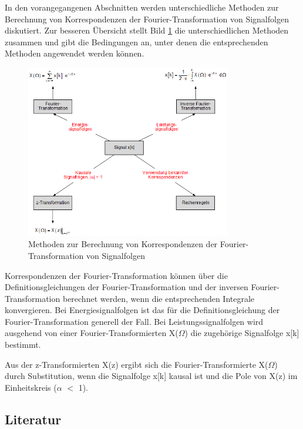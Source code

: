 \noindent In den vorangegangenen Abschnitten werden unterschiedliche Methoden zur Berechnung von Korrespondenzen der Fourier-Transformation von Signalfolgen diskutiert. Zur besseren \"{U}bersicht stellt Bild \ref{fig:MethodenFourierTransformation} die unterschiedlichen Methoden zusammen und gibt die Bedingungen an, unter denen die entsprechenden Methoden angewendet werden k\"{o}nnen.

\begin{figure}[H]
  \centerline{\includegraphics[width=0.8\textwidth]{Kapitel7/Bilder/image21.png}}
  \caption{Methoden zur Berechnung von Korrespondenzen der Fourier-Transformation von Signalfolgen}
  \label{fig:MethodenFourierTransformation}
\end{figure}

\noindent Korrespondenzen der Fourier-Transformation k\"{o}nnen \"{u}ber die Definitionsgleichungen der Fourier-Transformation und der inversen Fourier-Transformation berechnet werden, wenn die entsprechenden Integrale konvergieren. Bei Energiesignalfolgen ist das f\"{u}r die Definitionsgleichung der Fourier-Transformation generell der Fall. Bei Leistungssignalfolgen wird ausgehend von einer Fourier-Transformierten X($\Omega$) die zugeh\"{o}rige Signalfolge x[k] bestimmt.

\noindent Aus der z-Transformierten X(z) ergibt sich die Fourier-Transformierte X($\Omega$) durch Substitution, wenn die Signalfolge x[k] kausal ist und die Pole von X(z) im Einheitskreis ({\textbar}$\alpha${\textbar} $\mathrm{<}$ 1).

\clearpage

\subsection{Literatur}


